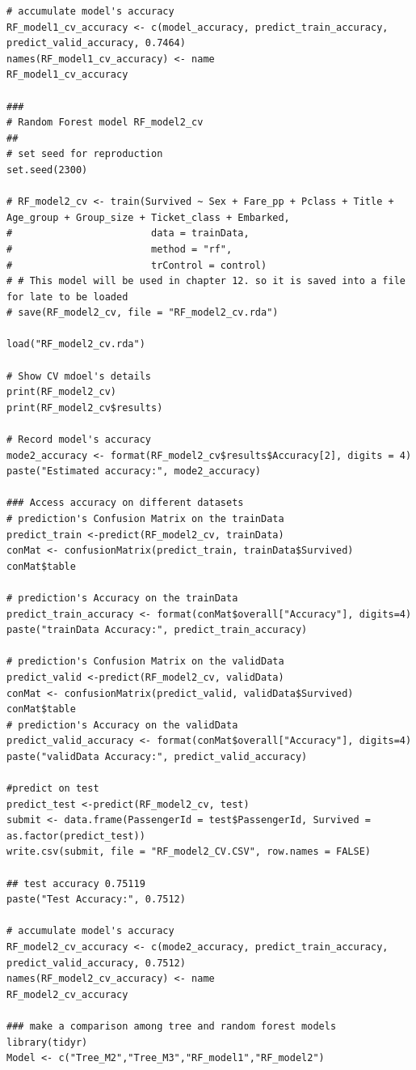 \documentclass[
]{book}
\begin{document}
\begin{verbatim}
# accumulate model's accuracy
RF_model1_cv_accuracy <- c(model_accuracy, predict_train_accuracy, predict_valid_accuracy, 0.7464)
names(RF_model1_cv_accuracy) <- name
RF_model1_cv_accuracy

###
# Random Forest model RF_model2_cv
##
# set seed for reproduction
set.seed(2300)

# RF_model2_cv <- train(Survived ~ Sex + Fare_pp + Pclass + Title + Age_group + Group_size + Ticket_class + Embarked,
#                        data = trainData,
#                        method = "rf",
#                        trControl = control)
# # This model will be used in chapter 12. so it is saved into a file for late to be loaded
# save(RF_model2_cv, file = "RF_model2_cv.rda")

load("RF_model2_cv.rda")

# Show CV mdoel's details
print(RF_model2_cv)
print(RF_model2_cv$results)

# Record model's accuracy
mode2_accuracy <- format(RF_model2_cv$results$Accuracy[2], digits = 4)
paste("Estimated accuracy:", mode2_accuracy)

### Access accuracy on different datasets
# prediction's Confusion Matrix on the trainData
predict_train <-predict(RF_model2_cv, trainData)
conMat <- confusionMatrix(predict_train, trainData$Survived)
conMat$table

# prediction's Accuracy on the trainData
predict_train_accuracy <- format(conMat$overall["Accuracy"], digits=4)
paste("trainData Accuracy:", predict_train_accuracy)

# prediction's Confusion Matrix on the validData
predict_valid <-predict(RF_model2_cv, validData)
conMat <- confusionMatrix(predict_valid, validData$Survived)
conMat$table
# prediction's Accuracy on the validData
predict_valid_accuracy <- format(conMat$overall["Accuracy"], digits=4)
paste("validData Accuracy:", predict_valid_accuracy)

#predict on test
predict_test <-predict(RF_model2_cv, test)
submit <- data.frame(PassengerId = test$PassengerId, Survived = as.factor(predict_test))
write.csv(submit, file = "RF_model2_CV.CSV", row.names = FALSE)

## test accuracy 0.75119
paste("Test Accuracy:", 0.7512)

# accumulate model's accuracy
RF_model2_cv_accuracy <- c(mode2_accuracy, predict_train_accuracy, predict_valid_accuracy, 0.7512)
names(RF_model2_cv_accuracy) <- name
RF_model2_cv_accuracy

### make a comparison among tree and random forest models
library(tidyr)
Model <- c("Tree_M2","Tree_M3","RF_model1","RF_model2")


\end{verbatim}
\end{document}
